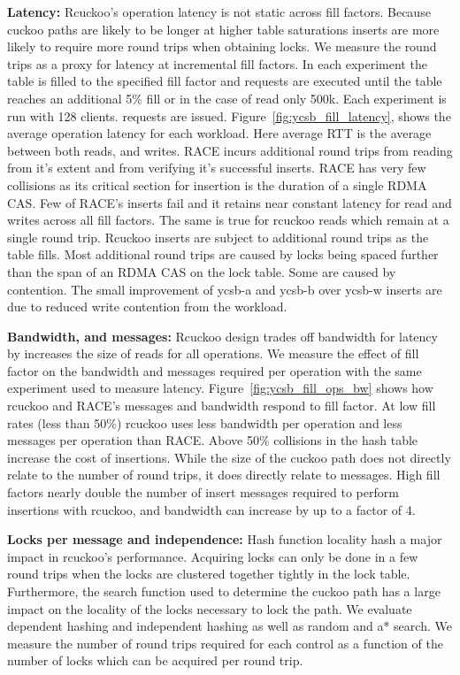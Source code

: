 \textbf{Latency:} Rcuckoo's operation latency is not static
across fill factors. Because cuckoo paths are likely to be
longer at higher table saturations inserts are more likely
to require more round trips when obtaining locks. We measure
the round trips as a proxy for latency at incremental fill
factors. In each experiment the table is filled to the
specified fill factor and requests are executed until the
table reaches an additional 5\% fill or in the case of read
only 500k. Each experiment is run with 128 clients.
requests are issued. 
Figure~\ref{fig:ycsb_fill_latency}, shows the average
operation latency for each workload. Here average RTT is the
average between both reads, and writes. RACE incurs
additional round trips from reading from it's extent and
from verifying it's successful inserts. RACE has very few
collisions as its critical section for insertion is the
duration of a single RDMA CAS. Few of RACE's inserts fail
and it retains near constant latency for read and writes
across all fill factors. The same is true for rcuckoo reads
which remain at a single round trip. Rcuckoo inserts are
subject to additional round trips as the table fills.  Most
additional round trips are caused by locks being spaced
further than the span of an RDMA CAS on the lock table. Some
are caused by contention. The small improvement of ycsb-a
and ycsb-b over ycsb-w inserts are due to reduced write
contention from the workload.

\textbf{Bandwidth, and messages:} Rcuckoo design trades off
bandwidth for latency by increases the size of reads for all
operations. We measure the effect of fill factor on the
bandwidth and messages required per operation with the same
experiment used to measure latency.
Figure~\ref{fig:ycsb_fill_ops_bw} shows how rcuckoo and
RACE's messages and bandwidth respond to fill factor. At low
fill rates (less than 50\%) rcuckoo uses less bandwidth per
operation and less messages per operation than RACE. Above
50\% collisions in the hash table increase the cost of
insertions. While the size of the cuckoo path does not
directly relate to the number of round trips, it does
directly relate to messages. High fill factors nearly double
the number of insert messages required to perform insertions
with rcuckoo, and bandwidth can increase by up to a factor of
4. 

\textbf{Locks per message and independence:} Hash function
locality hash a major impact in rcuckoo's performance.
Acquiring locks can only be done in a few round trips when
the locks are clustered together tightly in the lock table.
Furthermore, the search function used to determine the
cuckoo path has a large impact on the locality of the locks
necessary to lock the path. We evaluate dependent hashing
and independent hashing as well as random and a* search. We
measure the number of round trips required for each control
as a function of the number of locks which can be acquired
per round trip.

